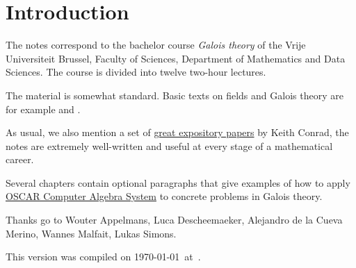 \section*{Introduction}

The notes correspond to the bachelor 
course \emph{Galois theory} of the 
Vrije Universiteit Brussel, 
Faculty of Sciences, 
Department of Mathematics and Data Sciences. The course
is divided into twelve two-hour lectures. 

The material is somewhat standard. Basic texts on fields and Galois theory 
are for example \cite{MR1645586} and 
\cite{MR3379917}. 

As usual, we also mention a set of 
\href{https://kconrad.math.uconn.edu/blurbs/}{great expository papers} by 
Keith Conrad, the notes are extremely well-written and useful  
at every stage of a mathematical career. 

Several chapters contain optional paragraphs that give examples of 
how to apply \href{https://oscar.computeralgebra.de/}{OSCAR Computer Algebra System}
to concrete problems in Galois theory. 

 
Thanks go to Wouter Appelmans, Luca Descheemaeker, 
Alejandro de la Cueva Merino, 
Wannes Malfait,
Lukas Simons. 


This version 
was compiled on \today~at~\currenttime.
